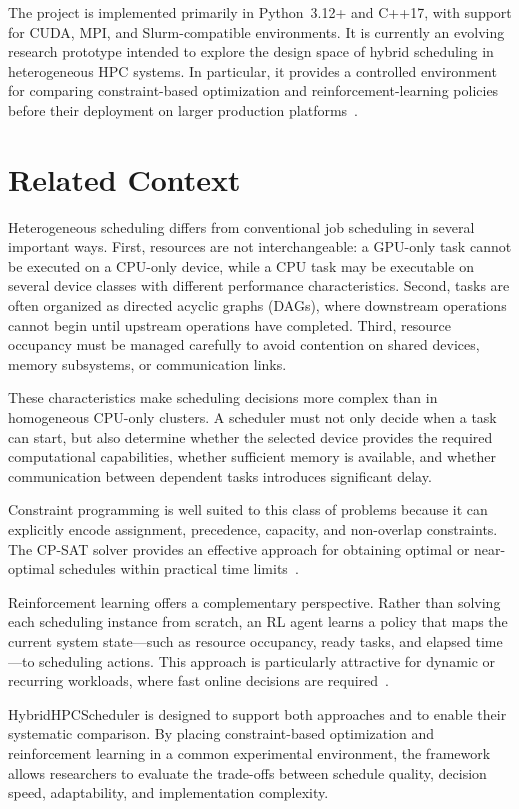 \documentclass[conference]{IEEEtran}
\begin{document}
The project is implemented primarily in Python~3.12+ and C++17, with support
for CUDA, MPI, and Slurm-compatible environments. It is currently an evolving
research prototype intended to explore the design space of hybrid scheduling in
heterogeneous HPC systems. In particular, it provides a controlled environment
for comparing constraint-based optimization and reinforcement-learning policies
before their deployment on larger production platforms~\cite{lemoine2026}.

\section{Related Context}
Heterogeneous scheduling differs from conventional job scheduling in several
important ways. First, resources are not interchangeable: a GPU-only task
cannot be executed on a CPU-only device, while a CPU task may be executable on
several device classes with different performance characteristics. Second,
tasks are often organized as directed acyclic graphs (DAGs), where downstream
operations cannot begin until upstream operations have completed. Third,
resource occupancy must be managed carefully to avoid contention on shared
devices, memory subsystems, or communication links.

These characteristics make scheduling decisions more complex than in
homogeneous CPU-only clusters. A scheduler must not only decide when a task can
start, but also determine whether the selected device provides the required
computational capabilities, whether sufficient memory is available, and whether
communication between dependent tasks introduces significant delay.

Constraint programming is well suited to this class of problems because it can
explicitly encode assignment, precedence, capacity, and non-overlap
constraints. The CP-SAT solver provides an effective approach for obtaining
optimal or near-optimal schedules within practical time limits~\cite{cpsat}.

Reinforcement learning offers a complementary perspective. Rather than solving
each scheduling instance from scratch, an RL agent learns a policy that maps
the current system state---such as resource occupancy, ready tasks, and elapsed
time---to scheduling actions. This approach is particularly attractive for
dynamic or recurring workloads, where fast online decisions are
required~\cite{ppo}.

HybridHPCScheduler is designed to support both approaches and to enable their
systematic comparison. By placing constraint-based optimization and
reinforcement learning in a common experimental environment, the framework
allows researchers to evaluate the trade-offs between schedule quality,
decision speed, adaptability, and implementation complexity.
\end{document}
